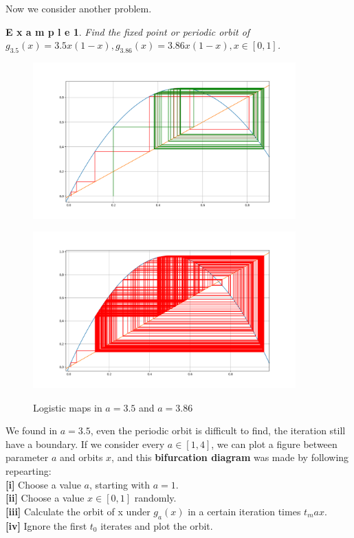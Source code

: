 \documentclass[12pt]{article}
\theoremstyle{plain}
\newtheorem{example}{\textbf{E x a m p l e}}[section]
\begin{document}
Now we consider another problem.

\begin{example} Find the fixed point or periodic orbit of $g_{3.5}(x) = 3.5x(1-x), g_{3.86}(x) = 3.86x(1-x), x \in [0, 1]$.
\end{example}


\begin{figure}[H]
\begin{minipage}[c][0.5\width]{
   0.5\textwidth}
   \centering
   \includegraphics[width=0.9\textwidth]{figure/section1/logistic35.png}
\end{minipage}
\begin{minipage}[c][0.5\width]{
   0.5\textwidth}
   \centering
   \includegraphics[width=0.9\textwidth]{figure/section1/logistic386.png} \\
\end{minipage}
\caption{Logistic maps in $a = 3.5$ and $a = 3.86$}\label{logistic-no-periodic}
\end{figure}

We found in $a = 3.5$, even the periodic orbit is difficult to find, the iteration still have a boundary. If we consider every $a \in [1, 4]$, we can plot a figure between parameter $a$ and orbits $x$, and this \textbf{bifurcation diagram} was made by following repearting:
\\\noindent \textbf{[i]} Choose a value $a$, starting with $a = 1$.
\\\noindent \textbf{[ii]} Choose a value $x \in [0, 1]$ randomly.
\\\noindent \textbf{[iii]} Calculate the orbit of x under $g_a(x)$ in a certain iteration times $t_max$.
\\\noindent \textbf{[iv]} Ignore the first $t_0$ iterates and plot the orbit.
\end{document}
